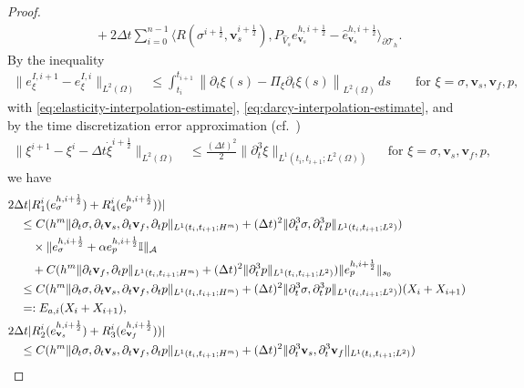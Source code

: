 \documentclass[10pt,letterpaper]{amsart}
\theoremstyle{plain} %
\theoremstyle{remark} %
\newcommand{\vect}[1]{\mathbf{#1}}
\newcommand{\Id}{\mathbb{I}} %
\newcommand{\Ael}{\mathcal{A}} %
\newcommand{\pThprod}[2]{\langle #1, #2 \rangle_{\partial \mathcal{T}_{h}}}
\begin{document}
\begin{proof}
\begin{align}
	\label{eq:fully-discrete-sum1}
	&\quad + 2\Delta t \sum_{i=0}^{n-1} \pThprod{R(\sigma^{i+\frac 12}, \vect{v}_s^{i+\frac 12})}{{P_{\widehat{V}_s}} e_{\vect{v}_{s}}^{h,i+\frac 12} - \widehat{e}_{\vect{v}_{s}}^{h,i+\frac 12}}.
\end{align}
%
By the inequality 
	\begin{align*}
		\|e_{\xi}^{I,i+1} - e_{\xi}^{I,i}\|_{L^2(\Omega)} &\le  \int_{t_i}^{t_{i+1}} \left\|\partial_t \xi (s) - \Pi_{\xi} \partial_t \xi(s)\right\|_{L^2(\Omega)}\,ds & & \text{ for } \xi = \sigma, \vect{v}_s, \vect{v}_f, p, 
	\end{align*}
	with \eqref{eq:elasticity-interpolation-estimate}, \eqref{eq:darcy-interpolation-estimate}, and by the time discretization error approximation (cf.~\cite[Lemma~6]{Lee-Bolanos:2025})
	\begin{align*}
		\|\xi^{i+1} - \xi^i - \Delta t \dot{\xi}^{i+\frac 12}\|_{L^2(\Omega)} &\le \frac{(\Delta t)^2}{2} \|\partial_t^3 \xi \|_{L^1(t_i, t_{i+1}; L^2(\Omega))} \quad \text{ for } \xi = \sigma, \vect{v}_s, \vect{v}_f, p,
	\end{align*}
we have 
%
\begin{align}
	\label{eq:Ri-estimate1}
	&2\Delta t |R_1^i(e_{\sigma}^{h,i+\frac 12}) + R_4^i(e_{p}^{h,i+\frac 12}))|
	\\
	\notag
	&\quad \le C( h^m \| {\partial_t \sigma, \partial_t \vect{v}_s, \partial_t \vect{v}_f, \partial_t p} \|_{L^1(t_i, t_{i+1}; H^m)} + (\Delta t)^2 \| \partial_t^3 \sigma, \partial_t^3 p \|_{L^1(t_i, t_{i+1}; L^2)}) 
    \\
    \notag
    &\qquad \times \| e_{\sigma}^{h,i+\frac 12} + \alpha e_{p}^{h,i+\frac 12}\Id \|_{\Ael} 
	\\
	\notag
	&\qquad + C( h^m \| {\partial_t \vect{v}_f}, \partial_t p \|_{L^1(t_i, t_{i+1}; H^m)} + (\Delta t)^2 \| \partial_t^3 p \|_{L^1(t_i, t_{i+1}; L^2)})\|e_{p}^{h,i+\frac 12}\|_{s_0}
	\\
	\notag
	&\quad \le  C( h^m \| {\partial_t \sigma, \partial_t \vect{v}_s, \partial_t \vect{v}_f, \partial_t p} \|_{L^1(t_i, t_{i+1}; H^m)} + (\Delta t)^2 \| \partial_t^3 \sigma, \partial_t^3 p \|_{L^1(t_i, t_{i+1}; L^2)}) (X_i + X_{i+1}) 
	\\
	\notag 
	& \quad =: E_{a,i}(X_{i} + X_{i+1}),
	\\
	\label{eq:Ri-estimate2}
	&2\Delta t |R_2^i(e_{\vect{v}_s}^{h,i+\frac 12}) + R_3^i(e_{\vect{v}_f}^{h,i+\frac 12}))|
	\\
	\notag
	&\quad \le C( h^m \| {\partial_t \sigma, \partial_t \vect{v}_s, \partial_t \vect{v}_f, \partial_t p} \|_{L^1(t_i, t_{i+1}; H^m)} + (\Delta t)^2 \| \partial_t^3 \vect{v}_s, \partial_t^3 \vect{v}_f \|_{L^1(t_i, t_{i+1}; L^2)}) 

\end{align}
\end{proof}
\end{document}

